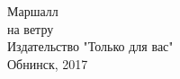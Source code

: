 { Маршалл\\
\medskip
{ на ветру}\\
\vspace{14cm}
Издательство "Только для вас"\\
\medskip
Обнинск, 2017\\}
